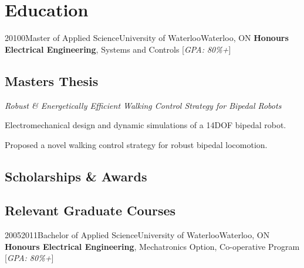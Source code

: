 \section{Education}

\vspace{2 mm}
\tlcventry
{2010}{0}{Master of Applied Science}{University of Waterloo}{Waterloo, ON}{}
{\textbf{Honours Electrical Engineering}, Systems and Controls [\emph{GPA: 80\%+}]}

\subsection{Masters Thesis} %
	{\emph{Robust \& Energetically Efficient Walking Control Strategy for Bipedal Robots}
	\begin{tightitemize}
		\item Electromechanical design and dynamic simulations of a 14DOF bipedal robot.
		\item Proposed a novel walking control strategy for robust bipedal locomotion.
	\end{tightitemize}}
	\vspace{-6 mm}
\subsection{Scholarships \& Awards} %
\subsection{Relevant Graduate Courses} %

\vspace{5 mm}
\tlcventry
{2005}{2011}{Bachelor of Applied Science}{University of Waterloo}{Waterloo, ON}{}
{\textbf{Honours Electrical Engineering}, Mechatronics Option, Co-operative Program
 [\emph{GPA: 80\%+}]}

